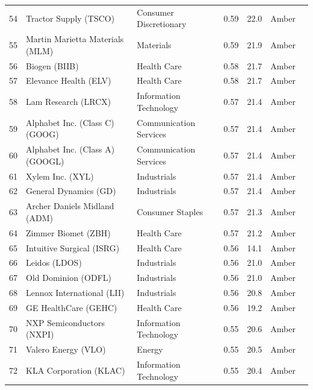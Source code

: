 \documentclass[11pt,a4paper]{article}
\begin{document}
{\begin{longtable}{r p{4.4cm} p{2.8cm} r r l l}
54 & Tractor Supply (TSCO) & Consumer Discretionary & 0.59 & 22.0 & \cellcolor[HTML]{FFEB9C}Amber &  \\
55 & Martin Marietta Materials (MLM) & Materials & 0.59 & 21.9 & \cellcolor[HTML]{FFEB9C}Amber &  \\
56 & Biogen (BIIB) & Health Care & 0.58 & 21.7 & \cellcolor[HTML]{FFEB9C}Amber &  \\
57 & Elevance Health (ELV) & Health Care & 0.58 & 21.7 & \cellcolor[HTML]{FFEB9C}Amber &  \\
58 & Lam Research (LRCX) & Information Technology & 0.57 & 21.4 & \cellcolor[HTML]{FFEB9C}Amber &  \\
59 & Alphabet Inc. (Class C) (GOOG) & Communication Services & 0.57 & 21.4 & \cellcolor[HTML]{FFEB9C}Amber &  \\
60 & Alphabet Inc. (Class A) (GOOGL) & Communication Services & 0.57 & 21.4 & \cellcolor[HTML]{FFEB9C}Amber &  \\
61 & Xylem Inc. (XYL) & Industrials & 0.57 & 21.4 & \cellcolor[HTML]{FFEB9C}Amber &  \\
62 & General Dynamics (GD) & Industrials & 0.57 & 21.4 & \cellcolor[HTML]{FFEB9C}Amber &  \\
63 & Archer Daniels Midland (ADM) & Consumer Staples & 0.57 & 21.3 & \cellcolor[HTML]{FFEB9C}Amber &  \\
64 & Zimmer Biomet (ZBH) & Health Care & 0.57 & 21.2 & \cellcolor[HTML]{FFEB9C}Amber &  \\
65 & Intuitive Surgical (ISRG) & Health Care & 0.56 & 14.1 & \cellcolor[HTML]{FFEB9C}Amber &  \\
66 & Leidos (LDOS) & Industrials & 0.56 & 21.0 & \cellcolor[HTML]{FFEB9C}Amber &  \\
67 & Old Dominion (ODFL) & Industrials & 0.56 & 21.0 & \cellcolor[HTML]{FFEB9C}Amber &  \\
68 & Lennox International (LII) & Industrials & 0.56 & 20.8 & \cellcolor[HTML]{FFEB9C}Amber &  \\
69 & GE HealthCare (GEHC) & Health Care & 0.56 & 19.2 & \cellcolor[HTML]{FFEB9C}Amber &  \\
70 & NXP Semiconductors (NXPI) & Information Technology & 0.55 & 20.6 & \cellcolor[HTML]{FFEB9C}Amber &  \\
71 & Valero Energy (VLO) & Energy & 0.55 & 20.5 & \cellcolor[HTML]{FFEB9C}Amber &  \\
72 & KLA Corporation (KLAC) & Information Technology & 0.55 & 20.4 & \cellcolor[HTML]{FFEB9C}Amber &  \\

\end{longtable}}
\end{document}
